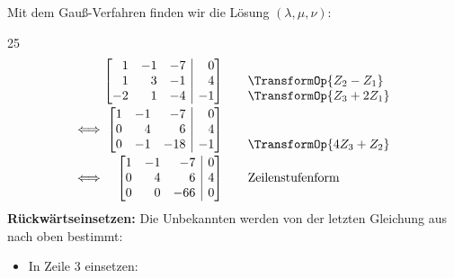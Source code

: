 \clearpage
\begin{tcolorbox}[
  scriptbox,
  breakable=false,
  borderline west={1.2pt}{0pt}{black!40},
  title={Beispiel~\ref{ex:analytic_geometry_line_plane_intersection_example} -- Fortsetzung}
]
  Mit dem Gauß-Verfahren finden wir die Lösung $(\lambda,\mu,\nu)$:
  \begin{ClozeArea}[34]{25}
    \[
      \begin{array}{r@{\;}r@{\qquad}l}
        \phantom{\Longleftrightarrow}
        &\left[
          \begin{array}{@{}rrr|r@{}}
            1&-1&-7&0\\
            1& 3&-1&4\\
           -2& 1&-4&-1
          \end{array}
        \right]
        &\begin{array}{@{}l@{}}
          {}\\
          \smash{\TransformOp{Z_2-Z_1}}\\
          \smash{\TransformOp{Z_3+2Z_1}}
        \end{array}\\[1.45em]
        \Longleftrightarrow
        &\left[
          \begin{array}{@{}rrr|r@{}}
            1&-1& -7& 0\\
            0& 4&  6& 4\\
            0&-1&-18&-1
          \end{array}
        \right]
        &\begin{array}{@{}l@{}}
          {}\\
          {}\\
          \smash{\TransformOp{4Z_3+Z_2}}
        \end{array}\\[1.45em]
        \Longleftrightarrow
        &\left[
          \begin{array}{@{}rrr|r@{}}
            1&-1& -7&0\\
            0& 4&  6&4\\
            0& 0&-66&0
          \end{array}
        \right]
        &\text{Zeilenstufenform}
      \end{array}
    \]
    \textbf{Rückwärtseinsetzen:} Die Unbekannten werden von der letzten
    Gleichung aus nach oben bestimmt:
    \begin{itemize}[leftmargin=1.6em,itemsep=0.25em,topsep=0.2em]
      \item In Zeile 3 einsetzen:

\end{itemize}
\end{ClozeArea}
\end{tcolorbox}
